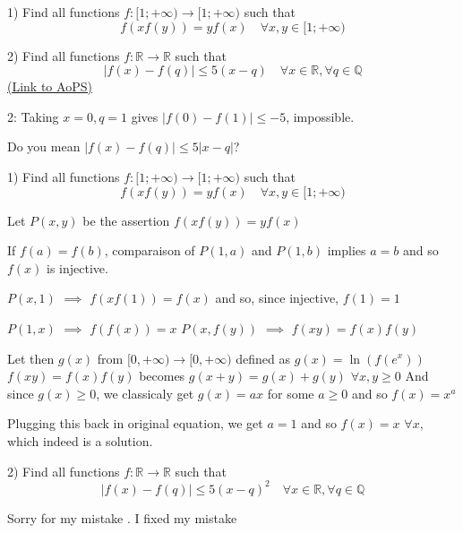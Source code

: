 \begin{problem}
	1) Find all  functions $f:[1;+\infty)\to[1;+\infty)$ such that 
\[f(xf(y))=yf(x) \quad\forall x,y\in [1;+\infty)\]

2) Find all functions $f:\mathbb{R}\to\mathbb{R}$ such that 
\[ \left | f(x)-f(q) \right |\leq 5(x-q) \quad  \forall x\in\mathbb{R}, \forall q\in\mathbb{Q} \]
	\flushright \href{https://artofproblemsolving.com/community/c6h562688}{(Link to AoPS)}
\end{problem}



\begin{solution}
	2: Taking $x = 0, q = 1$ gives $|f(0) - f(1)| \le -5$, impossible.

Do you mean $|f(x) - f(q)| \le 5|x-q|$?
\end{solution}



\begin{solution}
	\begin{tcolorbox}1) Find all  functions $f:[1;+\infty)\to[1;+\infty)$ such that 
\[f(xf(y))=yf(x) \quad\forall x,y\in [1;+\infty)\]\end{tcolorbox}
Let $P(x,y)$ be the assertion $f(xf(y))=yf(x)$

If $f(a)=f(b)$, comparaison of $P(1,a)$ and $P(1,b)$ implies $a=b$ and so $f(x)$ is injective.

$P(x,1)$ $\implies$ $f(xf(1))=f(x)$ and so, since injective, $f(1)=1$

$P(1,x)$ $\implies$ $f(f(x))=x$
$P(x,f(y))$ $\implies$ $f(xy)=f(x)f(y)$

Let then $g(x)$ from $[0,+\infty)\to [0,+\infty)$ defined as $g(x)=\ln(f(e^x))$ 
$f(xy)=f(x)f(y)$ becomes $g(x+y)=g(x)+g(y)$ $\forall x,y\ge 0$
And since $g(x)\ge 0$, we classicaly get $g(x)=ax$ for some $a\ge 0$ and so $f(x)=x^a$

Plugging this back in original equation, we get $a=1$ and so $\boxed{f(x)=x}$ $\forall x$, which indeed is a solution.
\end{solution}



\begin{solution}
	2) Find all functions $f:\mathbb{R}\to\mathbb{R}$ such that 
\[ \left | f(x)-f(q) \right |\leq 5(x-q)^2 \quad  \forall x\in\mathbb{R}, \forall q\in\mathbb{Q} \]

Sorry for my mistake . I fixed my mistake
\end{solution}




